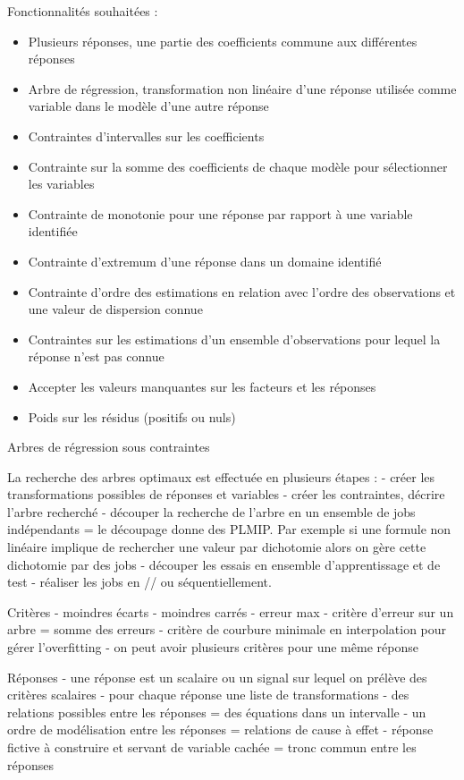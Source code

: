 


Fonctionnalités souhaitées :
\begin{itemize}
	\item Plusieurs réponses, une partie des coefficients commune aux différentes réponses
	\item Arbre de régression, transformation non linéaire d'une réponse utilisée comme variable dans le modèle d'une autre réponse
	\item Contraintes d'intervalles sur les coefficients
	\item Contrainte sur la somme des coefficients de chaque modèle pour sélectionner les variables
	\item Contrainte de monotonie pour une réponse par rapport à une variable identifiée
	\item Contrainte d'extremum d'une réponse dans un domaine identifié
	\item Contrainte d'ordre des estimations en relation avec l'ordre des observations et une valeur de dispersion connue
	\item Contraintes sur les estimations d'un ensemble d'observations pour lequel la réponse n'est pas connue
	\item Accepter les valeurs manquantes sur les facteurs et les réponses
	\item Poids sur les résidus (positifs ou nuls)
\end{itemize}



Arbres de régression sous contraintes

La recherche des arbres optimaux est effectuée en plusieurs étapes :
- créer les transformations possibles de réponses et variables
- créer les contraintes, décrire l'arbre recherché
- découper la recherche de l'arbre en un ensemble de jobs indépendants = le découpage donne des PLMIP. Par exemple si une formule non linéaire implique de rechercher une valeur par dichotomie alors on gère cette dichotomie par des jobs
- découper les essais en ensemble d'apprentissage et de test
- réaliser les jobs en // ou séquentiellement.

Critères
- moindres écarts
- moindres carrés
- erreur max
- critère d'erreur sur un arbre = somme des erreurs 
- critère de courbure minimale en interpolation pour gérer l'overfitting
- on peut avoir plusieurs critères pour une même réponse

Réponses
- une réponse est un scalaire ou un signal sur lequel on prélève des critères scalaires
- pour chaque réponse une liste de transformations
- des relations possibles entre les réponses = des équations dans un intervalle
- un ordre de modélisation entre les réponses = relations de cause à effet
- réponse fictive à construire et servant de variable cachée = tronc commun entre les réponses

